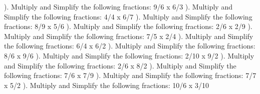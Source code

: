 \documentclass{article}%
\begin{document}
). Multiply and Simplify the following fractions: 9/6 x 6/3%
\newline%
\newline%
). Multiply and Simplify the following fractions: 4/4 x 6/7%
\newline%
\newline%
). Multiply and Simplify the following fractions: 8/9 x 5/6%
\newline%
\newline%
). Multiply and Simplify the following fractions: 2/6 x 2/9%
\newline%
\newline%
). Multiply and Simplify the following fractions: 7/5 x 2/4%
\newline%
\newline%
). Multiply and Simplify the following fractions: 6/4 x 6/2%
\newline%
\newline%
). Multiply and Simplify the following fractions: 8/6 x 9/6%
\newline%
\newline%
). Multiply and Simplify the following fractions: 2/10 x 9/2%
\newline%
\newline%
). Multiply and Simplify the following fractions: 2/6 x 8/2%
\newline%
\newline%
). Multiply and Simplify the following fractions: 7/6 x 7/9%
\newline%
\newline%
). Multiply and Simplify the following fractions: 7/7 x 5/2%
\newline%
\newline%
). Multiply and Simplify the following fractions: 10/6 x 3/10%
\newline%
\newline%
\newline%
\end{document}
